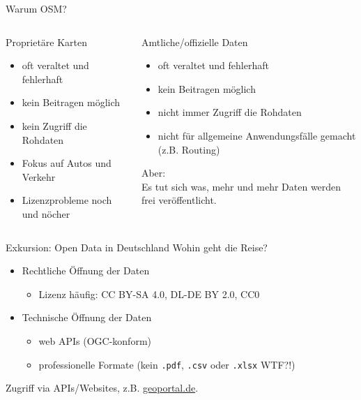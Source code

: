 \documentclass{beamer}
\begin{document}
			\begin{frame}{Warum OSM?}
				\begin{columns}[t]
					\begin{column}{0.5\textwidth}
						Proprietäre Karten
						\begin{itemize}
							\item oft veraltet und fehlerhaft\pause
							\item kein Beitragen möglich\pause
							\item kein Zugriff die Rohdaten\pause
							\item Fokus auf Autos und Verkehr\pause
							\item Lizenzprobleme noch und nöcher
						\end{itemize}
					\end{column}
					\pause
					\begin{column}{0.5\textwidth}
						Amtliche/offizielle Daten
						\begin{itemize}
							\item oft veraltet und fehlerhaft\pause
							\item kein Beitragen möglich\pause
							\item nicht immer Zugriff die Rohdaten\pause
							\item nicht für allgemeine Anwendungsfälle gemacht (z.B. Routing)\pause
						\end{itemize}
						\pause
						Aber:\\
						Es tut sich was, mehr und mehr Daten werden frei veröffentlicht.
					\end{column}
				\end{columns}
			\end{frame}
			
			\begin{frame}{Exkursion: Open Data in Deutschland}
				Wohin geht die Reise?
				\begin{itemize}
					\item Rechtliche Öffnung der Daten
					\begin{itemize}
						\item Lizenz häufig: CC BY-SA 4.0, DL-DE BY 2.0, CC0
					\end{itemize}\pause
					\item Technische Öffnung der Daten
					\begin{itemize}
						\item web APIs (OGC-konform)
						\item professionelle Formate (kein \texttt{.pdf}, \texttt{.csv} oder \texttt{.xlsx} WTF?!)
					\end{itemize}
				\end{itemize}
				\pause
				\vspace{0.25cm}
				Zugriff via APIs/Websites, z.B. \href{https://www.geoportal.de/}{geoportal.de}.
			\end{frame}
			
\end{document}
